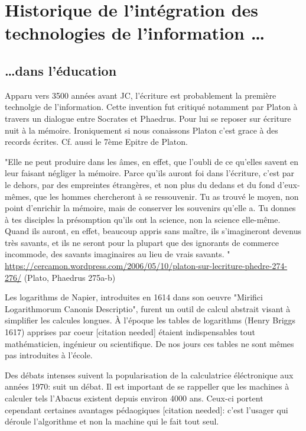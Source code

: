 
\chapter{Historique de l'intégration des technologies de l'information \ldots}\label{quoi}

\section{\ldots dans l'éducation}

Apparu vers 3500 années avant JC, l'écriture est probablement la première 
technolgie de l'information. Cette invention fut critiqué notamment par Platon
à travers un dialogue entre Socrates et Phaedrus. Pour lui se reposer sur 
écriture nuit à la mémoire. Ironiquement si nous conaissons Platon c'est grace
à des records écrites. Cf. aussi le 7ème Epitre de Platon.

"Elle ne peut produire dans les âmes, en effet, que l’oubli de ce qu’elles 
savent en leur faisant négliger la mémoire. Parce qu’ils auront foi dans 
l’écriture, c’est par le dehors, par des empreintes étrangères, et non plus du 
dedans et du fond d’eux-mêmes, que les hommes chercheront à se ressouvenir. Tu 
as trouvé le moyen, non point d’enrichir la mémoire, mais de conserver les 
souvenirs qu’elle a. Tu donnes à tes disciples la présomption qu’ils ont la 
science, non la science elle-même. Quand ils auront, en effet, beaucoup appris 
sans maître, ils s’imagineront devenus très savants, et ils ne seront pour la 
plupart que des ignorants de commerce incommode, des savants imaginaires au lieu
 de vrais savants. "
\url{https://cercamon.wordpress.com/2006/05/10/platon-sur-lecriture-phedre-274-276/}
(Plato, Phaedrus 275a-b)

Les logarithms de Napier, introduites en 1614 dans son oeuvre "Mirifici 
Logarithmorum Canonis Descriptio", furent un outil de calcul abstrait visant à 
simplifier les calcules longues. À l'époque les tables de logarithms (Henry 
Briggs 1617) apprises par coeur [citation needed] étaient indispensables tout 
mathématicien, ingénieur ou scientifique. De nos jours ces tables ne sont mêmes 
pas introduites à l'école. 

Des débats intenses suivent la popularisation de la calculatrice éléctronique 
aux années 1970: suit un débat. Il est important de se rappeller que les 
machines à calculer tels l'Abacus existent depuis environ 4000 ans. Ceux-ci 
portent cependant certaines avantages pédaogiques [citation needed]: c'est 
l'usager qui déroule l'algorithme et non la machine qui le fait tout seul. 

